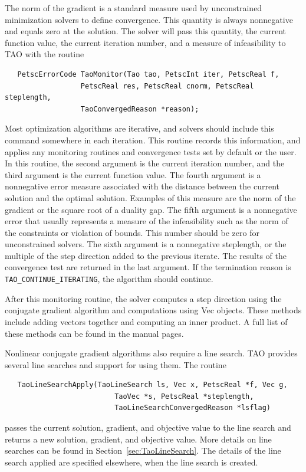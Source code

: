 \documentclass[]{book}
\begin{document}
The norm of the gradient is a standard measure used
by unconstrained minimization solvers to define convergence.
This quantity is always nonnegative and equals zero at the solution.  
The solver will pass this quantity, the current
function value, the current iteration number, and a measure of
infeasibility to TAO with the routine
\begin{verbatim}
   PetscErrorCode TaoMonitor(Tao tao, PetscInt iter, PetscReal f,
                  PetscReal res, PetscReal cnorm, PetscReal steplength,
                  TaoConvergedReason *reason);
\end{verbatim}
Most optimization algorithms are iterative, and solvers should
include this command somewhere in each iteration.  This routine
records this information, and applies any monitoring routines and 
convergence tests set by default or the user.
In this routine, the second argument is the current
iteration number, and the third argument is the current function value.
The fourth argument is a nonnegative error measure associated with the
distance between the current solution and the optimal solution.  Examples
of this measure are the norm of the gradient or the square root of a duality 
gap. The fifth argument is a nonnegative error 
that usually
represents a measure of the infeasibility
such as the norm of the constraints or violation of bounds.
This number should be zero for unconstrained solvers.
The sixth argument is a nonnegative steplength, 
or the multiple of the step direction added to the previous iterate.
The results of the convergence test are returned in the last argument.
If the termination reason is {\tt TAO\_CONTINUE\_ITERATING}, the
algorithm should continue.

After this monitoring routine, the solver computes a step direction
using the conjugate gradient algorithm and computations using Vec objects.  
These methods include
adding vectors together and computing an inner product.  A full list
of these methods can be found in the manual pages.

Nonlinear conjugate gradient algorithms also require a line search.  TAO
provides several line searches and support for using them.
The routine
\begin{verbatim}
   TaoLineSearchApply(TaoLineSearch ls, Vec x, PetscReal *f, Vec g, 
                          TaoVec *s, PetscReal *steplength, 
                          TaoLineSearchConvergedReason *lsflag)
\end{verbatim}
passes the current solution, gradient, and objective value to the
line search and returns a new solution, gradient, and objective value.  More
details on line searches can be found in Section~\ref{sec:TaoLineSearch}.
The details of the line search applied are specified elsewhere, when
the line search is created.
\end{document}
